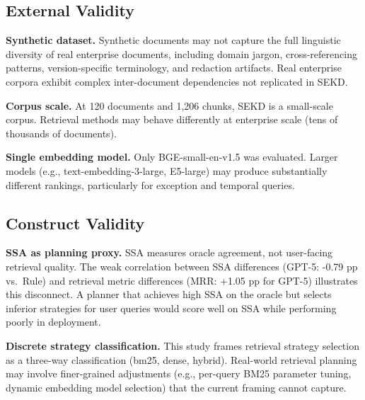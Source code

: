 \subsection{External Validity}

\textbf{Synthetic dataset.} Synthetic documents may not capture the full linguistic diversity of real enterprise documents, including domain jargon, cross-referencing patterns, version-specific terminology, and redaction artifacts. Real enterprise corpora exhibit complex inter-document dependencies not replicated in SEKD.

\textbf{Corpus scale.} At 120 documents and 1,206 chunks, SEKD is a small-scale corpus. Retrieval methods may behave differently at enterprise scale (tens of thousands of documents).

\textbf{Single embedding model.} Only BGE-small-en-v1.5 was evaluated. Larger models (e.g., text-embedding-3-large, E5-large) may produce substantially different rankings, particularly for exception and temporal queries.

\subsection{Construct Validity}

\textbf{SSA as planning proxy.} SSA measures oracle agreement, not user-facing retrieval quality. The weak correlation between SSA differences (GPT-5: -0.79 pp vs.\ Rule) and retrieval metric differences (MRR: +1.05 pp for GPT-5) illustrates this disconnect. A planner that achieves high SSA on the oracle but selects inferior strategies for user queries would score well on SSA while performing poorly in deployment.

\textbf{Discrete strategy classification.} This study frames retrieval strategy selection as a three-way classification (bm25, dense, hybrid). Real-world retrieval planning may involve finer-grained adjustments (e.g., per-query BM25 parameter tuning, dynamic embedding model selection) that the current framing cannot capture.
